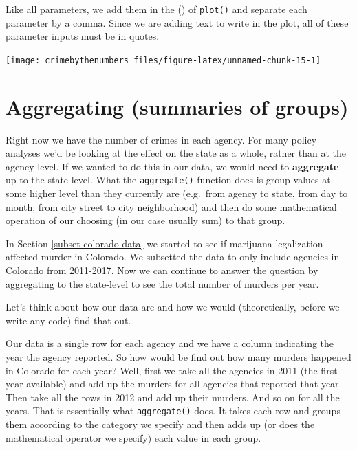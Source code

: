 \documentclass[
  12pt,
]{book}
\newenvironment{Shaded}{\begin{snugshade}}{\end{snugshade}}
\newcommand{\DataTypeTok}[1]{\textcolor[rgb]{0.27,0.27,0.27}{#1}}
\newcommand{\KeywordTok}[1]{\textcolor[rgb]{0.27,0.27,0.27}{\textbf{#1}}}
\newcommand{\NormalTok}[1]{#1}
\newcommand{\OperatorTok}[1]{\textcolor[rgb]{0.43,0.43,0.43}{\textbf{#1}}}
\newcommand{\StringTok}[1]{\textcolor[rgb]{0.5,0.5,0.5}{#1}}
\begin{document}
Like all parameters, we add them in the () of \texttt{plot()} and separate each parameter by a comma. Since we are adding text to write in the plot, all of these parameter inputs must be in quotes.

\begin{Shaded}
\end{Shaded}

\begin{center}\texttt{[image: crimebythenumbers\_files/figure-latex/unnamed-chunk-15-1]} \end{center}

\hypertarget{aggregate}{%
\section{Aggregating (summaries of groups)}\label{aggregate}}

Right now we have the number of crimes in each agency. For many policy analyses we'd be looking at the effect on the state as a whole, rather than at the agency-level. If we wanted to do this in our data, we would need to \textbf{aggregate} up to the state level. What the \texttt{aggregate()} function does is group values at some higher level than they currently are (e.g.~from agency to state, from day to month, from city street to city neighborhood) and then do some mathematical operation of our choosing (in our case usually sum) to that group.

In Section \ref{subset-colorado-data} we started to see if marijuana legalization affected murder in Colorado. We subsetted the data to only include agencies in Colorado from 2011-2017. Now we can continue to answer the question by aggregating to the state-level to see the total number of murders per year.

Let's think about how our data are and how we would (theoretically, before we write any code) find that out.

Our data is a single row for each agency and we have a column indicating the year the agency reported. So how would be find out how many murders happened in Colorado for each year? Well, first we take all the agencies in 2011 (the first year available) and add up the murders for all agencies that reported that year. Then take all the rows in 2012 and add up their murders. And so on for all the years. That is essentially what \texttt{aggregate()} does. It takes each row and groups them according to the category we specify and then adds up (or does the mathematical operator we specify) each value in each group.
\end{document}

